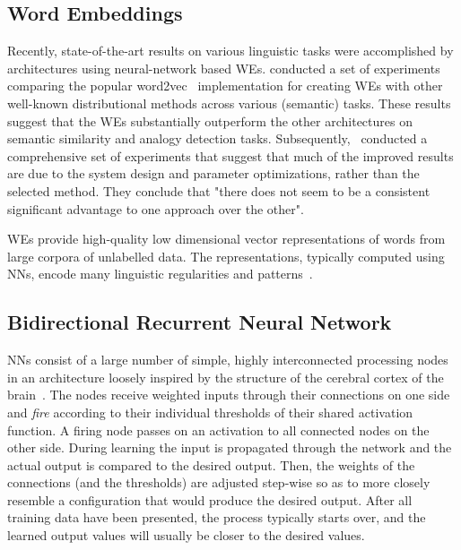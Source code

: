 \documentclass[11pt,a4paper]{article}
\begin{document}
\subsection{Word Embeddings} %
\label{subsec:we}

Recently, state-of-the-art results on various linguistic tasks were accomplished by architectures using neural-network based WEs.
 conducted a set of experiments comparing the popular word2vec~\cite{DBLP:journals/corr/abs-1301-3781,arXiv:1310.4546} implementation for creating WEs with other well-known distributional methods across various (semantic) tasks.
These results suggest that the WEs substantially outperform the other architectures on semantic similarity and analogy detection tasks.
Subsequently,~ conducted a comprehensive set of experiments that suggest that much of the improved results are due to the system design and parameter optimizations, rather than the selected method. 
They conclude that "there does not seem to be a consistent significant advantage to one approach over the other".

WEs provide high-quality low dimensional vector representations of words from large corpora of unlabelled data. The representations, typically computed using NNs, encode many linguistic regularities and patterns~\cite{arXiv:1310.4546}.


\subsection{Bidirectional Recurrent Neural Network}  %
\label{subsec:nn}

NNs consist of a large number of simple, highly interconnected processing nodes in an architecture loosely inspired by the structure of the cerebral cortex of the brain~\cite{oreilly2000}.
The nodes receive weighted inputs through their connections on one side and \emph{fire} according to their individual thresholds of their shared activation function.
A firing node passes on an activation to all connected nodes on the other side.
During learning the input is propagated through the network and the actual output is compared to the desired output. 
Then, the weights of the connections (and the thresholds) are adjusted step-wise so as to more closely resemble a configuration that would produce the desired output.
After all training data have been presented, the process typically starts over, and the learned output values will usually be closer to the desired values.
\end{document}
